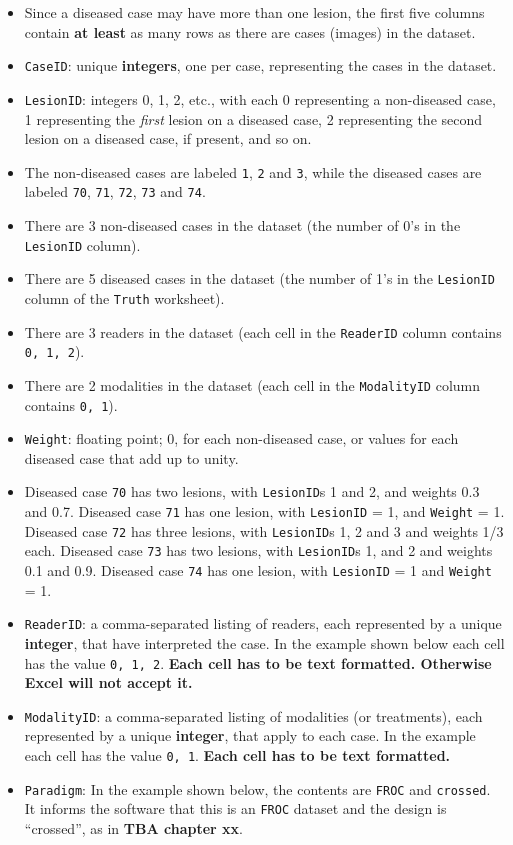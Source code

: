 \documentclass[
]{book}
\providecommand{\tightlist}{%
  \setlength{\itemsep}{0pt}\setlength{\parskip}{0pt}}
\begin{document}
\begin{itemize}
\tightlist
\item
  Since a diseased case may have more than one lesion, the first five columns contain \textbf{at least} as many rows as there are cases (images) in the dataset.
\item
  \texttt{CaseID}: unique \textbf{integers}, one per case, representing the cases in the dataset.
\item
  \texttt{LesionID}: integers 0, 1, 2, etc., with each 0 representing a non-diseased case, 1 representing the \emph{first} lesion on a diseased case, 2 representing the second lesion on a diseased case, if present, and so on.
\item
  The non-diseased cases are labeled \texttt{1}, \texttt{2} and \texttt{3}, while the diseased cases are labeled \texttt{70}, \texttt{71}, \texttt{72}, \texttt{73} and \texttt{74}.
\item
  There are 3 non-diseased cases in the dataset (the number of 0's in the \texttt{LesionID} column).
\item
  There are 5 diseased cases in the dataset (the number of 1's in the \texttt{LesionID} column of the \texttt{Truth} worksheet).
\item
  There are 3 readers in the dataset (each cell in the \texttt{ReaderID} column contains \texttt{0,\ 1,\ 2}).
\item
  There are 2 modalities in the dataset (each cell in the \texttt{ModalityID} column contains \texttt{0,\ 1}).
\item
  \texttt{Weight}: floating point; 0, for each non-diseased case, or values for each diseased case that add up to unity.\\
\item
  Diseased case \texttt{70} has two lesions, with \texttt{LesionID}s 1 and 2, and weights 0.3 and 0.7. Diseased case \texttt{71} has one lesion, with \texttt{LesionID} = 1, and \texttt{Weight} = 1. Diseased case \texttt{72} has three lesions, with \texttt{LesionID}s 1, 2 and 3 and weights 1/3 each. Diseased case \texttt{73} has two lesions, with \texttt{LesionID}s 1, and 2 and weights 0.1 and 0.9. Diseased case \texttt{74} has one lesion, with \texttt{LesionID} = 1 and \texttt{Weight} = 1.
\item
  \texttt{ReaderID}: a comma-separated listing of readers, each represented by a unique \textbf{integer}, that have interpreted the case. In the example shown below each cell has the value \texttt{0,\ 1,\ 2}. \textbf{Each cell has to be text formatted. Otherwise Excel will not accept it.}
\item
  \texttt{ModalityID}: a comma-separated listing of modalities (or treatments), each represented by a unique \textbf{integer}, that apply to each case. In the example each cell has the value \texttt{0,\ 1}. \textbf{Each cell has to be text formatted.}
\item
  \texttt{Paradigm}: In the example shown below, the contents are \texttt{FROC} and \texttt{crossed}. It informs the software that this is an \texttt{FROC} dataset and the design is ``crossed'', as in \textbf{TBA chapter xx}.
\end{itemize}
\end{document}
